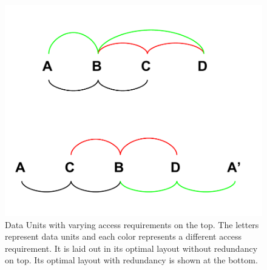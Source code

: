 \begin{figure}[h!]
\centering
\includegraphics[width=\columnwidth]{DataLayoutPaper_TheoryLayouts.pdf}
\caption{Data Units with varying access requirements on the top. The letters represent data units and each color represents a different access requirement. It is laid out in its optimal layout without redundancy on top. Its optimal layout with redundancy is shown at the bottom.}
\label{fig:startingProb}
\end{figure}

